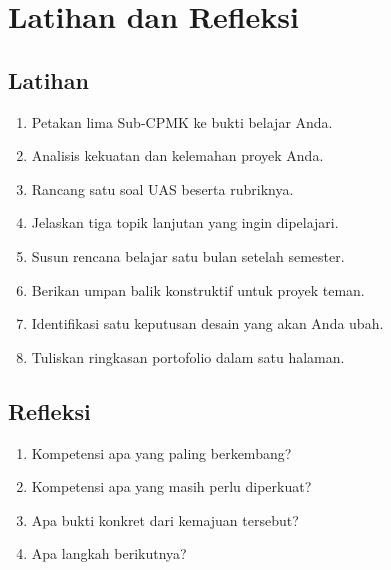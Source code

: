 \section*{Latihan dan Refleksi}

\subsection*{Latihan}
\begin{enumerate}[label=\arabic*.,leftmargin=*]
  \item Petakan lima Sub-CPMK ke bukti belajar Anda.
  \item Analisis kekuatan dan kelemahan proyek Anda.
  \item Rancang satu soal UAS beserta rubriknya.
  \item Jelaskan tiga topik lanjutan yang ingin dipelajari.
  \item Susun rencana belajar satu bulan setelah semester.
  \item Berikan umpan balik konstruktif untuk proyek teman.
  \item Identifikasi satu keputusan desain yang akan Anda ubah.
  \item Tuliskan ringkasan portofolio dalam satu halaman.
\end{enumerate}

\subsection*{Refleksi}
\begin{reflectionbox}
\begin{enumerate}[label=\arabic*.,leftmargin=*]
  \item Kompetensi apa yang paling berkembang?
  \item Kompetensi apa yang masih perlu diperkuat?
  \item Apa bukti konkret dari kemajuan tersebut?
  \item Apa langkah berikutnya?
\end{enumerate}
\end{reflectionbox}
